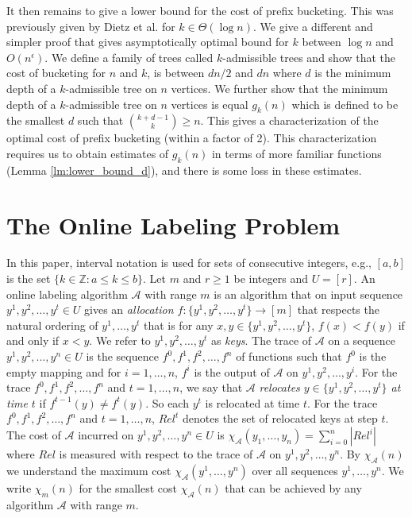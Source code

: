 \documentclass[runningheads,a4paper]{llncs}
\newcommand{\A}{\mathcal{A}}
\begin{document}
It then remains to give a lower bound
for the cost of prefix bucketing.  This was previously given by Dietz et al. \cite{DSZ04} for $k\in \Theta(\log n)$. 
We give a different and simpler proof that gives asymptotically optimal bound for $k$ between $\log n$ and $O(n^\epsilon)$.
We define a family of trees called $k$-admissible trees and show that the cost
of bucketing  for $n$ and $k$, is between $dn/2$ and $dn$ where $d$ is the minimum depth of a $k$-admissible tree
on $n$ vertices.  We further show that the minimum depth of a $k$-admissible tree on $n$ vertices
is equal $g_k(n)$ which is defined to be the smallest $d$ such that $\binom{k+d-1}{k} \geq n$.  
This gives a  characterization of the optimal cost of prefix bucketing (within a factor of 2).  This
characterization requires us to obtain estimates of $g_k(n)$ in terms of more familiar functions (Lemma \ref{lm:lower_bound_d}), 
and there is some loss in these estimates.

\section{The Online Labeling Problem}\label{s-olp}

In this paper, interval notation is used for sets of consecutive integers, e.g.,
$[a,b]$ is the set $\{k \in \mathbb{Z}:a \leq k \leq b\}$. Let $m$ and $r\ge 1$ be integers and $U=[r]$.
An online labeling algorithm $\A$ with range $m$ is an algorithm that on input sequence $y^1,y^2,\dots,y^t \in U$ gives
an \emph{allocation $f : \{y^1,y^2,\dots,y^t\} \rightarrow [m]$} that respects the natural ordering of $y^1,\dots,y^t$ 
that is for any $x,y\in \{y^1,y^2,\dots,y^t\}$, $f(x) < f(y)$ if and only if $x < y$. We refer to $y^1,y^2,\dots,y^t$
as \emph{keys}. The trace of $\A$ on a sequence $y^1,y^2,\dots,y^n\in U$ is the sequence $f^0,f^1,f^2,\dots,f^n$ of functions
such that $f^0$ is the empty mapping and for $i=1,\dots,n$, $f^i$ is the output of $\A$ on $y^1,y^2,\dots,y^i$. 
For the trace $f^0,f^1,f^2,\dots,f^n$ and $t=1,\dots,n$, we say that $\A$ \emph{relocates $y\in \{y^1,y^2,\dots,y^t\}$ at time $t$} 
if $f^{t-1}(y)\not=f^t(y)$. So each $y^t$ is relocated at time $t$. 
For the trace $f^0,f^1,f^2,\dots,f^n$ and $t=1,\dots,n$, $Rel^t$ denotes the set of relocated keys at step $t$.
The cost of $\A$ incurred on $y^1,y^2,\dots,y^n\in U$ is $\chi_\A(y_1,\dots,y_n)=\sum_{i=0}^n |Rel^i|$ where $Rel$ is 
measured with respect to the trace of $\A$ on $y^1,y^2,\dots,y^n$. By $\chi_\A(n)$ we understand the maximum cost
$\chi_\A(y^1,\dots,y^n)$ over all sequences $y^1,\dots,y^n$. We write $\chi_m(n)$ for the smallest cost $\chi_\A(n)$ that 
can be achieved by any algorithm $\A$ with range $m$.
\end{document}

